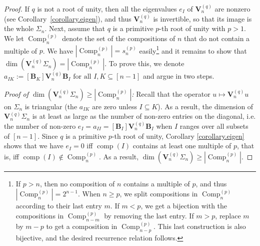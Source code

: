 \documentclass[revision]{FPSAC2025}
\newcommand{\VVq}{\mathbf{V}^{(q)}} %
\newcommand{\comp}{\operatorname{comp}}
\newcommand{\Comp}{\operatorname{Comp}}
\begin{document}
\begin{proof}
If $q$ is not a root of unity,
then all the eigenvalues $e_I$ of $\VVq_n$ are nonzero (see Corollary~\ref{corollary.eigen}),
and thus $\VVq_n$ is invertible, so that its image is the whole $\Sigma_n$. Next, assume that $q$ is a primitive $p$-th root of unity with $p>1$.
We let $\Comp_n^{(p)}$ denote the set of the compositions of $n$ that do not contain a multiple of $p$.
We have $|\Comp_n^{(p)}| = s_n^{(p)}$ easily\footnote{%
If $p >n$, then no composition of $n$ contains a multiple of $p$, and thus $|\Comp_n^{(p)}| = 2^{n-1}$.
When $n\geq p$, we split compositions in $\Comp_n^{(p)}$ according to their last entry $m$.
If $m <p$, we get a bijection with the compositions in $\Comp_{n-m}^{(p)}$ by removing the last entry.
If $m>p$, replace $m$ by $m-p$ to get a composition in $\Comp_{n-p}^{(p)}$.
This last construction is also bijective, and the desired recurrence relation follows.} and it remains to show that $\dim\left(\mathbf{V}_n^{(q)}\Sigma_n\right) = |\Comp_n^{(p)}|$.
To prove this, we denote
$
a_{IK} := [\mathbf{B}_K]\mathbf{V}^{(q)}_n\mathbf{B}_I  \text{ for all } I, K \subseteq [n-1] 
$
and argue in two steps.

\textit{Proof of $\dim\left(\mathbf{V}_n^{(q)}\Sigma_n\right) \geq |\Comp_n^{(p)}|$:}
Recall that the operator $u \mapsto \mathbf{V}_n^{(q)} u$ on $\Sigma_n$ is triangular (the $a_{IK}$ are zero unless $I\subseteq K$). As a result, the dimension of $\mathbf{V}_n^{(q)}\Sigma_n$  is at least as large as the number of non-zero entries on the diagonal, i.e. the number of non-zero $e_I=a_{II}=[\mathbf{B}_I]\mathbf{V}^{(q)}_n\mathbf{B}_I$ when $I$ ranges over all subsets of $[n-1]$.
Since $q$ is a primitive $p$-th root of unity, Corollary \ref{corollary.eigen} shows that we have $e_I =0$ iff $\comp(I)$ contains at least one multiple of $p$, that is, iff $\comp(I) \notin \Comp_n^{(p)}$.
As a result, $\dim\left(\mathbf{V}_n^{(q)}\Sigma_n\right) \geq |\Comp_n^{(p)}|$.


\end{proof}
\end{document}
